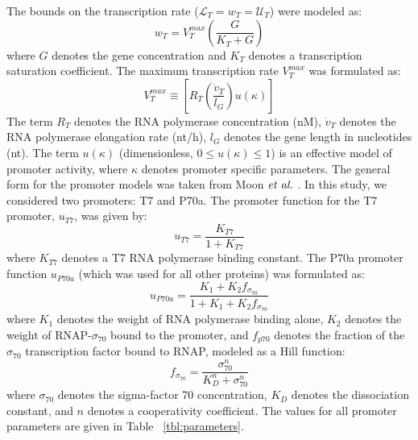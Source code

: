 \documentclass[journal=asbcd6,manuscript=article]{achemso}
\begin{document}
The bounds on the transcription rate ($\mathcal{L}_{T}=w_{T}=\mathcal{U}_{T}$) were modeled as:
\begin{equation}
	w_{T} = V_{T}^{max}\left(\frac{G}{K_{T}+G}\right)
\end{equation}
where $G$ denotes the gene concentration and $K_{T}$ denotes a transcription saturation coefficient.
The maximum transcription rate $V_{T}^{max}$ was formulated as:
\begin{equation}
	V_{T}^{max} \equiv \left[R_{T}\left(\frac{\dot{v}_{T}}{l_{G}}\right)u\left(\kappa\right)\right]
\end{equation}
The term $R_{T}$ denotes the RNA polymerase concentration (nM),
$\dot{v}_{T}$ denotes the RNA polymerase elongation rate (nt/h),
$l_{G}$ denotes the gene length in nucleotides (nt).
The term $u\left(\kappa\right)$ (dimensionless, $0\leq u\left(\kappa\right)\leq 1$)
is an effective model of promoter activity, where $\kappa$ denotes promoter specific parameters.
The general form for the promoter models was taken from Moon $\emph{et~al.}$ \cite{Moon:2012ab}.
In this study, we considered two promoters: T7 and P70a.
The promoter function for the T7 promoter, $u_{T7}$, was given by:
\begin{equation}
	u_{T7} = \frac{K_{T7}}{1 + K_{T7}}
\end{equation}
where $K_{T7}$ denotes a T7 RNA polymerase binding constant.
The P70a promoter function $u_{P70a}$ (which was used for all other proteins) was formulated as:
\begin{equation}
	u_{P70a} = \frac{K_{1}+K_{2}f_{\sigma_{70}}}{1 + K_{1}+K_{2}f_{\sigma_{70}}}
\end{equation}
where $K_{1}$ denotes the weight of RNA polymerase binding alone,
$K_{2}$ denotes the weight of RNAP-$\sigma_{70}$ bound to the promoter,
and $f_{p70}$ denotes the fraction of the $\sigma_{70}$ transcription factor bound to RNAP, modeled as a Hill function:
\begin{equation}
	f_{\sigma_{70}} = \frac{\sigma_{70}^{n}}{K_{D}^{n} + \sigma_{70}^{n}}
\end{equation}
where $\sigma_{70}$ denotes the sigma-factor 70 concentration, $K_{D}$ denotes the dissociation constant, and $n$ denotes a cooperativity coefficient.
The values for all promoter parameters are given in Table ~\ref{tbl:parameters}.
\end{document}
